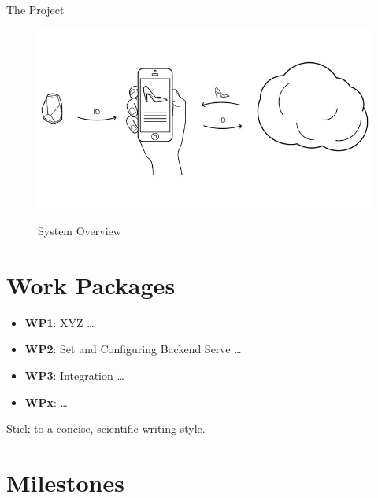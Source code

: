 \documentclass{report}
\newcommand{\lfig}[1]{\label{fig:#1}}
\begin{document}
The Project 

\begin{figure}[h]
	\centering
    \includegraphics[width=\columnwidth]{overview.jpg}
    \lfig{system-overview}
    \vspace{-5mm} %
	\caption{System Overview~\cite{estimote}}
\end{figure}

\section{Work Packages}


\begin{itemize}
        \item {\bf WP1}:  XYZ  \ldots    
        \item {\bf WP2}: Set and Configuring Backend Serve  \ldots    
        \item {\bf WP3}: Integration  \ldots 
         \item {\bf WPx}:  \ldots 
\end{itemize}
 
Stick to a concise, scientific writing style. 

\section{Milestones}




\end{document}
